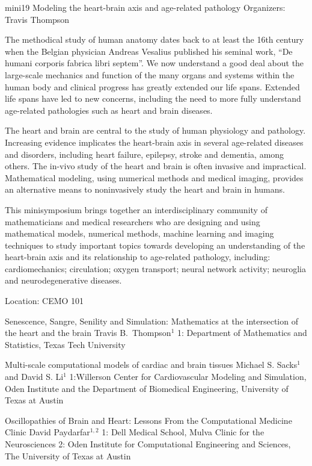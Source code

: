 \mini
{mini19}
{Modeling the heart-brain axis and age-related pathology}
{Organizers: Travis Thompson}
{The methodical study of human anatomy dates back to at least the 16th century when the Belgian physician Andreas Vesalius published his seminal work, ``De humani corporis fabrica libri septem''.  We now understand a good deal about the large-scale mechanics and function of the many organs and systems within the human body and clinical progress has greatly extended our life spans.  Extended life spans have led to new concerns, including the need to more fully understand age-related pathologies such as heart and brain diseases.

The heart and brain are central to the study of human physiology and pathology.  Increasing evidence implicates the heart-brain axis in several age-related diseases and disorders, including heart failure, epilepsy, stroke and dementia, among others.  The in-vivo study of the heart and brain is often invasive and impractical.  Mathematical modeling, using numerical methods and medical imaging, provides an alternative means to noninvasively study the heart and brain in humans.

This minisymposium brings together an interdisciplinary community of mathematicians and medical researchers who are designing and using mathematical models, numerical methods, machine learning and imaging techniques to study important topics towards developing an understanding of the heart-brain axis and its relationship to age-related pathology, including: cardiomechanics; circulation; oxygen transport; neural network activity; neuroglia and neurodegenerative diseases.}
{Location: CEMO 101}

\begin{talks}
\item\talk
{Senescence, Sangre, Senility and Simulation: Mathematics at the intersection of the heart and the brain}
{Travis B.~Thompson$^{1}$}
{1: Department of Mathematics and Statistics, Texas Tech University}
\item\talk
{Multi-scale computational models of cardiac and brain tissues}
{Michael S. Sacks$^{1}$ and David S. Li$^{1}$}
{1:Willerson Center for Cardiovascular Modeling and Simulation, Oden Institute and the Department of Biomedical Engineering, University of Texas at Austin }
\item\talk
{Oscillopathies of Brain and Heart: Lessons From the Computational Medicine Clinic}
{David Paydarfar$^{1,2}$}
{1: Dell Medical School, Mulva Clinic for the Neurosciences 2: Oden Institute for Computational Engineering and Sciences,
The University of Texas at Austin}
\end{talks}
\room
